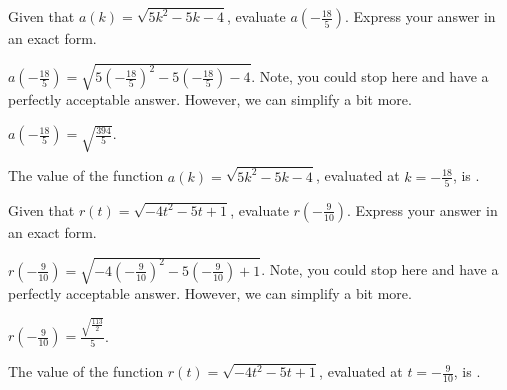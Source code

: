 \begin{shuffle}
\begin{exercise}
Given that $a(k)=\sqrt{5 k^2-5 k-4}$, evaluate $a\left(-\frac{18}{5}\right)$. Express your answer in an exact form.
\begin{solution}
\begin{hint}
$a\left(-\frac{18}{5}\right)=\sqrt{5 (-\frac{18}{5})^2-5 (-\frac{18}{5})-4}$. Note, you could stop here and have a perfectly acceptable answer. However, we can simplify a bit more. 
\end{hint}
\begin{hint}
$a\left(-\frac{18}{5}\right)=\sqrt{\frac{394}{5}}$.
\end{hint}
The value of the function $a(k)=\sqrt{5 k^2-5 k-4}$, evaluated at $k=-\frac{18}{5}$, is .
\end{solution}
\end{exercise}

\begin{exercise}
Given that $r(t)=\sqrt{-4 t^2-5 t+1}$, evaluate $r\left(-\frac{9}{10}\right)$. Express your answer in an exact form.
\begin{solution}
\begin{hint}
$r\left(-\frac{9}{10}\right)=\sqrt{-4 (-\frac{9}{10})^2-5 (-\frac{9}{10})+1}$. Note, you could stop here and have a perfectly acceptable answer. However, we can simplify a bit more. 
\end{hint}
\begin{hint}
$r\left(-\frac{9}{10}\right)=\frac{\sqrt{\frac{113}{2}}}{5}$.
\end{hint}
The value of the function $r(t)=\sqrt{-4 t^2-5 t+1}$, evaluated at $t=-\frac{9}{10}$, is .
\end{solution}
\end{exercise}
\end{shuffle}




